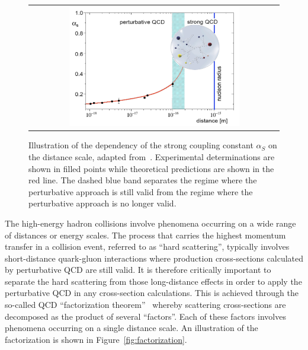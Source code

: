 \begin{figure}[tbh!]
 \begin{center}
 \begin{tabular}{c}
 \includegraphics[width=0.7\textwidth]{figures/Part1/QCD/pQCD}
 \end{tabular}
 \caption{Illustration of the dependency of the strong coupling constant $\alpha_{S}$ on the distance scale, adapted from~\cite{Messchendorp:2013ysj}. Experimental determinations are shown in filled points while theoretical predictions are shown in the red line. The dashed blue band separates the regime where the perturbative approach is still valid from the regime where the perturbative approach is no longer valid.}
 \label{fig:pQCD}
 \end{center}
\end{figure}

The high-energy hadron collisions involve phenomena occurring on a wide range of distances or energy scales. The process that carries the highest momentum transfer in a collision event, referred to as ``hard scattering'', typically involves short-distance quark-gluon interactions where production cross-sections calculated by perturbative \ac{QCD} are still valid. It is therefore critically important to separate the hard scattering from those long-distance effects in order to apply the perturbative \ac{QCD} in any cross-section calculations. This is achieved through the so-called \ac{QCD} ``factorization theorem''~\cite{Collins:1989gx} whereby scattering cross-sections are decomposed as the product of several ``factors''. Each of these factors involves phenomena occurring on a single distance scale. An illustration of the factorization is shown in Figure~\ref{fig:factorization}.

